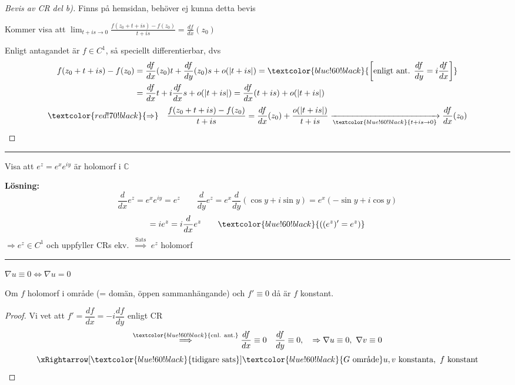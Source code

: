 \begin{proof}[Bevis av CR del b)]
\textcolor{magenta!80!black}{Finns på hemsidan, behöver ej kunna detta bevis}

Kommer visa att $\displaystyle\lim_{t + is \to 0} \frac{f(z_0 + t + is) - f(z_0)}{t + is} = \frac{df}{dx}(z_0)$

Enligt antagandet är $f \in C^1$, så speciellt differentierbar, dvs
\begin{align*}
  f(z_0 + t + is) - f(z_0) &= \frac{df}{dx}(z_0)t + \frac{df}{dy}(z_0)s + o(|t + is|) = \textcolor{blue!60!black}{\left[\text{enligt ant. } \frac{df}{dy} = i\frac{df}{dx}\right]} \\
  &= \frac{df}{dx}t + i\frac{df}{dx}s + o(|t + is|) = \frac{df}{dx}(t + is) + o(|t + is|)
\end{align*}
\[ \textcolor{red!70!black}{\Rightarrow} \quad \frac{f(z_0 + t + is) - f(z_0)}{t + is} = \frac{df}{dx}(z_0) + \frac{o(|t + is|)}{t + is} \xrightarrow[\textcolor{blue!60!black}{t + is \to 0}]{} \frac{df}{dx}(z_0) \]
\end{proof}

\noindent\rule{\linewidth}{0.4pt}

\begin{example}
Visa att $e^z = e^x e^{iy}$ är holomorf i $\mathbb{C}$

\textbf{Lösning:}
\[ \frac{d}{dx} e^z = e^x e^{iy} = e^z \qquad \frac{d}{dy} e^z = e^x \frac{d}{dy}(\cos y + i\sin y) = e^x(-\sin y + i\cos y) \]
\[ = ie^z = i\frac{d}{dx}e^z \qquad \textcolor{blue!60!black}{((e^z)' = e^z)} \]
$\Rightarrow e^z \in C^1$ och uppfyller CRs ekv.\ $\overset{\text{Sats}}{\Rightarrow}$ $e^z$ holomorf
\end{example}

\noindent\rule{\linewidth}{0.4pt}

\begin{theorem}[2.17]
\hfill \textcolor{magenta!80!black}{$\nabla u \equiv 0 \Leftrightarrow \nabla u = 0$}

Om $f$ holomorf i område (= domän, öppen sammanhängande) och $f' \equiv 0$ då är $f$ konstant.
\end{theorem}
\begin{proof}
Vi vet att $f' = \dfrac{df}{dx} = -i\dfrac{df}{dy}$ enligt CR
\[ \overset{\textcolor{blue!60!black}{\text{enl. ant.}}}{\Longrightarrow} \frac{df}{dx} \equiv 0 \quad \frac{df}{dy} \equiv 0, \quad \Rightarrow \nabla u \equiv 0, \ \nabla v \equiv 0 \]
\[ \xRightarrow[\textcolor{blue!60!black}{\text{tidigare sats}}]{\textcolor{blue!60!black}{G \text{ område}}} u, v \text{ konstanta}, \ f \text{ konstant} \]
\end{proof}

